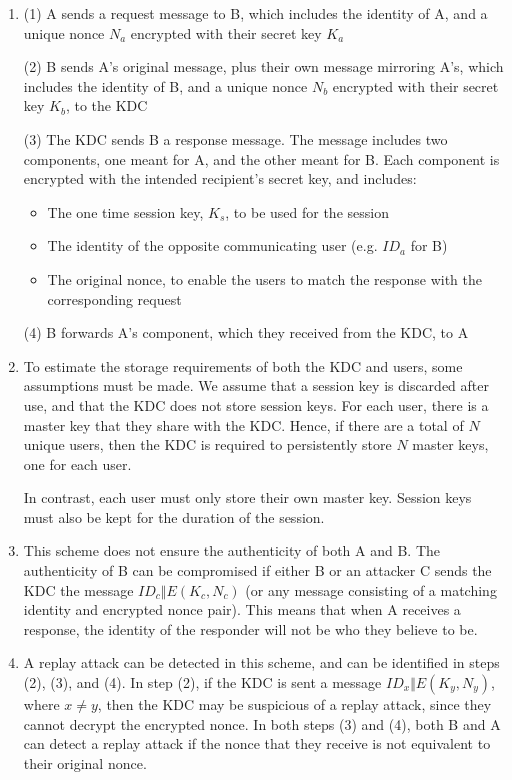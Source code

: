 \documentclass[12pt]{article}
\begin{document}
\begin{enumerate}
\item (1) A sends a request message to B, which includes the identity of A, and a unique nonce $N_{a}$
encrypted with their secret key $K_{a}$

(2) B sends A's original message, plus their own message mirroring A's, which includes the identity of B,
and a unique nonce $N_{b}$ encrypted with their secret key $K_{b}$, to the KDC

(3) The KDC sends B a response message. The message includes two components, one meant for A, and the other meant for B.
Each component is encrypted with the intended recipient's secret key, and includes:
\begin{itemize}
	\item The one time session key, $K_{s}$, to be used for the session
	\item The identity of the opposite communicating user (e.g. $ID_{a}$ for B)
	\item The original nonce, to enable the users to match the response with the corresponding request
\end{itemize}

(4) B forwards A's component, which they received from the KDC, to A 


\item To estimate the storage requirements of both the KDC and users, some assumptions must be made.
We assume that a session key is discarded after use, and that the KDC does not store session keys. For each
user, there is a master key that they share with the KDC. Hence, if there are a total of $N$ unique users, then
the KDC is required to persistently store $N$ master keys, one for each user.

In contrast, each user must only store their own master key. Session keys must also be kept for the
duration of the session.

\item This scheme does not ensure the authenticity of both A and B. The authenticity of B can be compromised if
either B or an attacker C sends the KDC the message $ID_{c} \Vert E(K_{c}, N_{c})$ (or any message consisting of a
matching identity and encrypted nonce pair). This means that when A receives a response, the identity of the 
responder will not be who they believe to be.

\item A replay attack can be detected in this scheme, and can be identified in steps (2), (3), and (4). In step (2), if the KDC
is sent a message $ID_{x} \Vert E(K_{y}, N_{y})$, where $x \neq y$, then the KDC may be suspicious of a replay
attack, since they cannot decrypt the encrypted nonce. In both steps (3) and (4), both B and A can detect a replay
attack if the nonce that they receive is not equivalent to their original nonce.

\end{enumerate}
\end{document}
